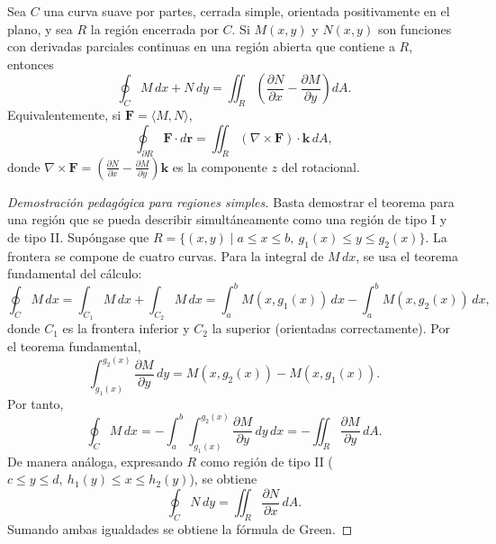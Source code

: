 \begin{theorem}
Sea $C$ una curva suave por partes, cerrada simple, orientada
positivamente en el plano, y sea $R$ la región encerrada por $C$.
Si $M(x,y)$ y $N(x,y)$ son funciones con derivadas parciales continuas
en una región abierta que contiene a $R$, entonces
\[
\oint_C M\,dx + N\,dy
= \iint_R \left( \frac{\partial N}{\partial x} - \frac{\partial M}{\partial y} \right) dA.
\]
Equivalentemente, si $\mathbf{F} = \langle M, N \rangle$,
\[
\oint_{\partial R} \mathbf{F} \cdot d\mathbf{r}
= \iint_R (\nabla \times \mathbf{F}) \cdot \mathbf{k} \, dA,
\]
donde $\nabla \times \mathbf{F} = \left( \frac{\partial N}{\partial x}
- \frac{\partial M}{\partial y} \right) \mathbf{k}$ es la componente
$z$ del rotacional.
\end{theorem}

\begin{proof}[Demostración pedagógica para regiones simples]
Basta demostrar el teorema para una región que se pueda describir
simultáneamente como una región de tipo I y de tipo II. Supóngase que
$R = \{(x,y) \mid a \le x \le b,\ g_1(x) \le y \le g_2(x)\}$. La
frontera se compone de cuatro curvas. Para la integral de $M\,dx$,
se usa el teorema fundamental del cálculo:
\[
\oint_C M\,dx
= \int_{C_1} M\,dx + \int_{C_2} M\,dx
= \int_a^b M(x,g_1(x))\,dx - \int_a^b M(x,g_2(x))\,dx,
\]
donde $C_1$ es la frontera inferior y $C_2$ la superior (orientadas
correctamente). Por el teorema fundamental,
\[
\int_{g_1(x)}^{g_2(x)} \frac{\partial M}{\partial y}\,dy
= M(x,g_2(x)) - M(x,g_1(x)).
\]
Por tanto,
\[
\oint_C M\,dx = - \int_a^b \int_{g_1(x)}^{g_2(x)}
\frac{\partial M}{\partial y}\,dy\,dx
= -\iint_R \frac{\partial M}{\partial y}\,dA.
\]
De manera análoga, expresando $R$ como región de tipo II
($c \le y \le d,\ h_1(y) \le x \le h_2(y)$), se obtiene
\[
\oint_C N\,dy = \iint_R \frac{\partial N}{\partial x}\,dA.
\]
Sumando ambas igualdades se obtiene la fórmula de Green.
\end{proof}

